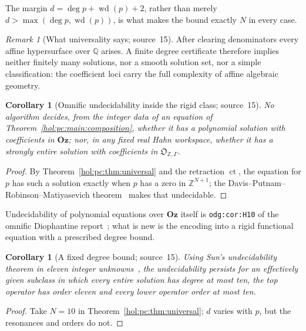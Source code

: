 \documentclass[11pt]{article}
\numberwithin{equation}{section}
\newtheorem{corollary}[theorem]{Corollary}
\theoremstyle{definition}
\theoremstyle{remark}
\newtheorem{remark}[theorem]{Remark}
\newcommand{\Q}{\mathbb Q}
\newcommand{\Z}{\mathbb Z}
\newcommand{\Oz}{\mathbf{Oz}}
\begin{document}
The margin $d=\deg p+\operatorname{wd}(p)+2$, rather than merely
$d>\max(\deg p,\operatorname{wd}(p))$, is what makes the bound exactly $N$ in
every case.

\begin{remark}[What universality says; source~15]\label{hol:pc:rem:universal}
After clearing denominators every affine hypersurface over $\Q$ arises. A finite
degree certificate therefore implies neither finitely many solutions, nor a
smooth solution set, nor a simple classification: the coefficient loci carry
the full complexity of affine algebraic geometry.
\end{remark}

\begin{corollary}[Omnific undecidability inside the rigid class; source~15]
\label{hol:pc:cor:undecidable}
No algorithm decides, from the integer data of an equation of
Theorem~\ref{hol:pc:main:composition}, whether it has a polynomial solution
with coefficients in $\Oz$; nor, in any fixed real Hahn workspace, whether it
has a strongly entire solution with coefficients in $\mathfrak O_{\Z,\Gamma}$.
\end{corollary}

\begin{proof}
By Theorem~\ref{hol:pc:thm:universal} and the retraction $\operatorname{ct}$, the equation
for $p$ has such a solution exactly when $p$ has a zero in $\Z^{N+1}$; the
Davis--Putnam--Robinson--Matiyasevich theorem~\cite{matiyasevich} makes that
undecidable.
\end{proof}

Undecidability of polynomial equations over $\Oz$ itself is
\texttt{odg:cor:H10} of the omnific Diophantine report~\cite{repoodg}; what is
new is the encoding into a rigid functional equation with a prescribed degree
bound.

\begin{corollary}[A fixed degree bound; source~15]\label{hol:pc:cor:ten}
Using Sun's undecidability theorem in eleven integer unknowns~\cite{sun}, the
undecidability persists for an effectively given subclass in which every
entire solution has degree at most ten, the top operator has order eleven and
every lower operator order at most ten.
\end{corollary}

\begin{proof}
Take $N=10$ in Theorem~\ref{hol:pc:thm:universal}; $d$ varies with $p$, but the
resonances and orders do not.
\end{proof}
\end{document}

